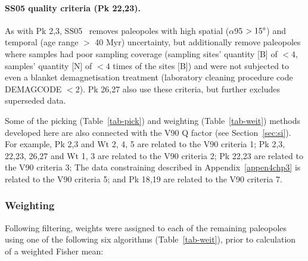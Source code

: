 \paragraph{SS05 quality criteria (Pk 22,23).}\label{subp:ss05} As with Pk 2,3,
SS05~\citep{S05} removes paleopoles with high spatial ($\alpha$95 $>15\degree$)
and temporal (age range $>$ 40 Myr) uncertainty, but additionally remove
paleopoles where samples had poor sampling coverage (sampling sites' quantity
[B] of $<4$, samples' quantity [N] of $<4$ times of the sites [B]) and were not
subjected to even a blanket demagnetisation treatment (laboratory cleaning
procedure code DEMAGCODE $<2$). Pk 26,27 also use these criteria, but
further excludes superseded data.

\bigskip
Some of the picking (Table~\ref{tab-pick}) and weighting
(Table~\ref{tab-weit}) methods developed here are also
connected with the V90 Q factor (see Section~\ref{sec:si}). For example, Pk 2,3
and Wt 2, 4, 5 are related to the V90 criteria 1; Pk 2,3, 22,23, 26,27 and Wt
1, 3 are related to the V90 criteria 2; Pk 22,23 are related to the V90
criteria 3; The data constraining described in Appendix~\ref{appen4chp3} is
related to the V90 criteria 5; and Pk 18,19 are related to the V90 criteria
7.

\subsubsection{Weighting}\label{sec:w}

Following filtering, weights were assigned to each of the remaining paleopoles
using one of the following six algorithms (Table~\ref{tab-weit}), prior to
calculation of a weighted Fisher mean:

